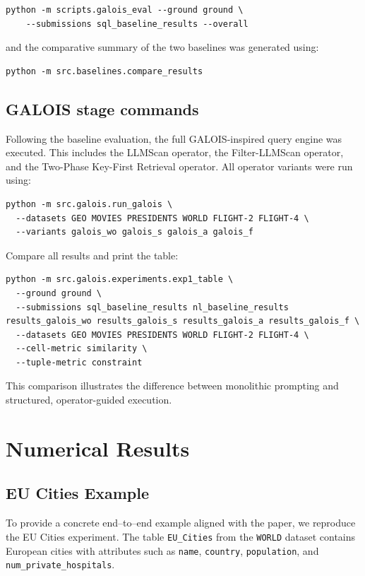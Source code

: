 \documentclass[11pt]{article}
\begin{document}
\begin{verbatim}
python -m scripts.galois_eval --ground ground \
    --submissions sql_baseline_results --overall
\end{verbatim}

and the comparative summary of the two baselines was generated using:

\begin{verbatim}
python -m src.baselines.compare_results
\end{verbatim}

\subsection{GALOIS stage commands}
Following the baseline evaluation, the full GALOIS-inspired query engine was executed. This includes the LLMScan operator, the Filter-LLMScan operator, and the Two-Phase Key-First Retrieval operator. All operator variants were run using:

\begin{verbatim}
python -m src.galois.run_galois \
  --datasets GEO MOVIES PRESIDENTS WORLD FLIGHT-2 FLIGHT-4 \
  --variants galois_wo galois_s galois_a galois_f
\end{verbatim}

Compare all results and print the table:

\begin{verbatim}
python -m src.galois.experiments.exp1_table \
  --ground ground \
  --submissions sql_baseline_results nl_baseline_results results_galois_wo results_galois_s results_galois_a results_galois_f \
  --datasets GEO MOVIES PRESIDENTS WORLD FLIGHT-2 FLIGHT-4 \
  --cell-metric similarity \
  --tuple-metric constraint
\end{verbatim}

This comparison illustrates the difference between monolithic prompting and structured, operator-guided execution.

\clearpage
\section{Numerical Results}

\subsection{EU Cities Example}
To provide a concrete end–to–end example aligned with the paper, we reproduce the EU Cities experiment. The table \texttt{EU\_Cities} from the \texttt{WORLD} dataset contains European cities with attributes such as \texttt{name}, \texttt{country}, \texttt{population}, and \texttt{num\_private\_hospitals}.
\end{document}
